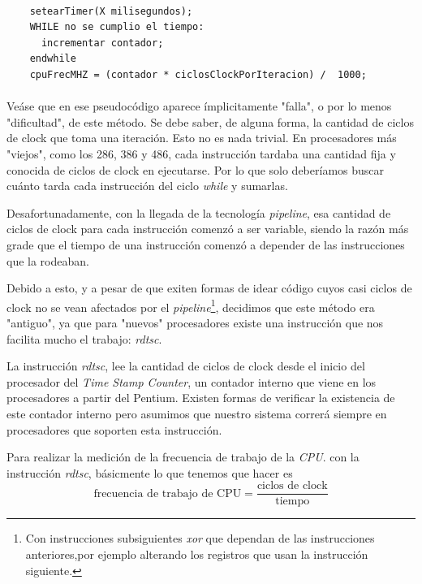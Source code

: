 \documentclass[a4paper,10pt]{article}
\begin{document}
    \paragraph*{}
    \begin{lstlisting}
    setearTimer(X milisegundos);
    WHILE no se cumplio el tiempo:
	  incrementar contador;
    endwhile
    cpuFrecMHZ = (contador * ciclosClockPorIteracion) /  1000;
    \end{lstlisting}
    \paragraph*{}
    Veáse que en ese pseudocódigo aparece ímplicitamente "falla", o por lo menos "dificultad", de este método. Se debe saber, de alguna forma, la cantidad de ciclos
    de clock que toma una iteración. Esto no es nada trivial. En procesadores más "viejos", como los 286, 386 y 486, cada instrucción tardaba una cantidad fija y conocida
    de ciclos de clock en ejecutarse. Por lo que solo deberíamos buscar cuánto tarda cada instrucción del ciclo \textit{while} y sumarlas.

    Desafortunadamente, con la llegada de la tecnología \textit{pipeline}, esa cantidad de ciclos de clock para cada instrucción comenzó a ser variable, siendo la 
    razón más grade que el tiempo de una instrucción comenzó a depender de las instrucciones que la rodeaban.

    Debido a esto, y a pesar de que exiten formas de idear código cuyos casi ciclos de clock no se vean afectados por el \textit{pipeline}\footnote{ Con 
    instrucciones subsiguientes \textit{xor} que dependan de las instrucciones anteriores,por ejemplo alterando los registros que usan la instrucción siguiente.}, 
    decidimos que este método era "antiguo", ya que para "nuevos" procesadores existe una instrucción que nos facilita mucho el trabajo: \textit{rdtsc}.

    La instrucción \textit{rdtsc}, lee la cantidad de ciclos de clock desde el inicio del procesador del \textit{Time Stamp Counter}, un contador interno que viene
    en los procesadores a partir del Pentium. Existen formas de verificar la existencia de este contador interno pero asumimos que nuestro sistema correrá siempre en
    procesadores que soporten esta instrucción.

    Para realizar la medición de la frecuencia de trabajo de la \textit{CPU}. con la instrucción \textit{rdtsc}, básicmente lo que tenemos que hacer es 
    \[  \text{frecuencia de trabajo de CPU} = \dfrac{\text{ciclos de clock}}{\text{tiempo}} \]
    
\end{document}
